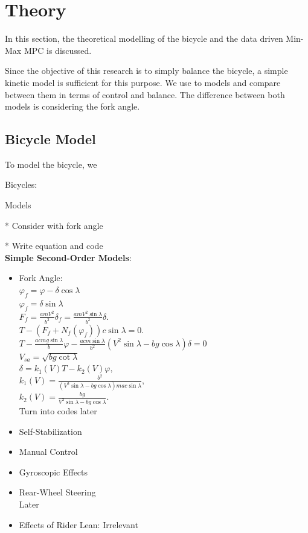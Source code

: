 \chapter{Theory}
In this section, the theoretical modelling of the bicycle and the data driven Min-Max MPC is discussed.

Since the objective of this research is to simply balance the bicycle, a simple kinetic model is sufficient for this purpose. We use to models and compare between them in terms of control and balance.
The difference between both models is considering the fork angle.

\section{Bicycle Model}
	To model the bicycle, we 
	
	
	
	
	Bicycles:
	
	Models \cite{astrom}
	
	* Consider with fork angle
	
	* Write equation and code
	\\
	
	\textbf{Simple Second-Order Models}:
	
	\begin{itemize}	
		\item Fork Angle:\\
		$\varphi_f = \varphi - \delta \cos \lambda$\\
		$\varphi_f =  \delta \sin \lambda$\\		
		$F_f = \frac{amV^2}{b^2} \delta_f = \frac{amV^2 \sin \lambda}{b^2} \delta.$\\
		$T - \left(F_f + N_f(\varphi_f)\right)c \sin \lambda = 0.$\\
		
		$T - \frac{acmg \sin \lambda}{b} \varphi - \frac{acm \sin \lambda}{b^2} \left(V^2 \sin \lambda - bg \cos \lambda\right) \delta = 0$
		\\
		$V_{sa} = \sqrt{bg \cot \lambda}$
		\\
		$\delta = k_1(V)T - k_2(V)\varphi,$
		\\
		$k_1(V) = \frac{b^2}{\left(V^2 \sin \lambda - bg \cos \lambda\right) mac \sin \lambda},$
		\\
		$k_2(V) = \frac{bg}{V^2 \sin \lambda - bg \cos \lambda}.$
		\\
		Turn into codes later
		\item Self-Stabilization
		\item Manual Control
		\item Gyroscopic Effects
		\item Rear-Wheel Steering\\
		Later
		\item Effects of Rider Lean: Irrelevant
	\end{itemize}
	
